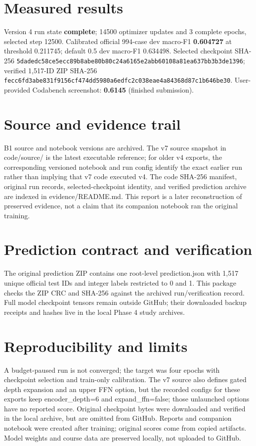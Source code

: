 \documentclass[11pt,a4paper]{article}
\begin{document}
\section{Measured results}
Version 4 run state \textbf{complete}; 14500 optimizer updates and 3 complete epochs, selected step 12500. Calibrated official 994-case dev macro-F1 \textbf{0.604727} at threshold 0.211745; default 0.5 dev macro-F1 0.634498. Selected checkpoint SHA-256 \texttt{5dadedc58ce5ecc89b8abe80b80c24a6165e2abb60108a81ea637bb3b3de1396}; verified 1,517-ID ZIP SHA-256 \texttt{fecc6fd3abe831f9156cf474dd5980a6edfc2c038eae4a84368d87c1b646be30}. User-provided Codabench screenshot: \textbf{0.6145} (finished submission).
\section{Source and evidence trail}
B1 source and notebook versions are archived. The v7 source snapshot in code/source/ is the latest executable reference; for older v4 exports, the corresponding versioned notebook and run config identify the exact earlier run rather than implying that v7 code executed v4. The code SHA-256 manifest, original run records, selected-checkpoint identity, and verified prediction archive are indexed in evidence/README.md. This report is a later reconstruction of preserved evidence, not a claim that its companion notebook ran the original training.
\section{Prediction contract and verification}
The original prediction ZIP contains one root-level prediction.json with 1,517 unique official test IDs and integer labels restricted to 0 and 1. This package checks the ZIP CRC and SHA-256 against the archived run/verification record. Full model checkpoint tensors remain outside GitHub; their downloaded backup receipts and hashes live in the local Phase 4 study archives.
\section{Reproducibility and limits}
A budget-paused run is not converged; the target was four epochs with checkpoint selection and train-only calibration. The v7 source also defines gated depth expansion and an upper FFN option, but the recorded configs for these exports keep encoder\_depth=6 and expand\_ffn=false; those unlaunched options have no reported score. Original checkpoint bytes were downloaded and verified in the local archive, but are omitted from GitHub. Reports and companion notebook were created after training; original scores come from copied artifacts. Model weights and course data are preserved locally, not uploaded to GitHub.
\end{document}
